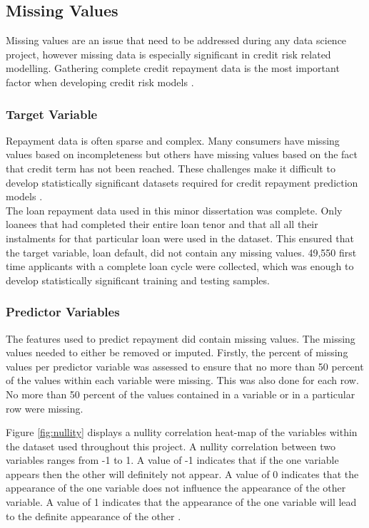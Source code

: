 \vspace{10pt}

\subsection{Missing Values}

Missing values are an issue that need to be addressed during any data science project, however missing data is especially significant in credit risk related modelling. Gathering complete credit repayment data is the most important factor when developing credit risk models \parencite{MissingValuesBos}.

\subsubsection{Target Variable}

Repayment data is often sparse and complex. Many consumers have missing values based on incompleteness but others have missing values based on the fact that credit term has not been reached. These challenges make it difficult to develop statistically significant datasets required for credit repayment prediction models \parencite{MissingValuesCR}. \\ 

The loan repayment data used in this minor dissertation was complete. Only loanees that had completed their entire loan tenor and that all all their instalments for that particular loan were used in the dataset. This ensured that the target variable, loan default, did not contain any missing values. 49,550 first time applicants with a complete loan cycle were collected, which was enough to develop statistically significant training and testing samples. 

\subsubsection{Predictor Variables}

The features used to predict repayment did contain missing values. The missing values needed to either be removed or imputed. Firstly, the percent of missing values per predictor variable was assessed to ensure that no more than 50 percent of the values within each variable were missing. This was also done for each row. No more than 50 percent of the values contained in a variable or in a particular row were missing. \newpage

Figure \ref{fig:nullity} displays a nullity correlation heat-map of the variables within the dataset used throughout this project. A nullity correlation between two variables ranges from -1 to 1. A value of -1 indicates that if the one variable appears then the other will definitely not appear. A value of 0 indicates that the  appearance of the one variable does not influence the appearance of the other variable. A value of 1 indicates that the appearance of the one variable will lead to the definite appearance of the other \parencite{nullity}.  \\

